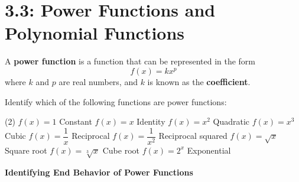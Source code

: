 \documentclass[../mathNotesPreamble]{subfiles}
\providecommand{\relscalefact}{1.4}
\begin{document}
\relscale{\relscalefact}
  \section{3.3: Power Functions and Polynomial Functions}
  \begin{defn*}
    A \textbf{power function} is a function that can be represented in the form
      \[f(x)=kx^p\]
    where $k$ and $p$ are real numbers, and $k$ is known as the \textbf{coefficient}.
  \end{defn*}
  \begin{ex*}
    \TabPositions{35mm}
    Identify which of the following functions are power functions:
    \begin{extasks}[after-item-skip=\stretch{1}](2)
      \task $f(x)=1$ \tab Constant
      \task $f(x)=x$ \tab Identity
      \task $f(x)=x^2$ \tab Quadratic
      \task $f(x)=x^3$ \tab Cubic
      \task $f(x)=\dfrac{1}{x}$ \tab Reciprocal
      \task $f(x)=\dfrac{1}{x^2}$ \tab Reciprocal squared
      \task $f(x)=\sqrt{x}$ \tab Square root
      \task $f(x)=\sqrt[3]{x}$ \tab Cube root
      \task $f(x)=2^x$ \tab Exponential
    \end{extasks}
  \end{ex*}
  \pagebreak

  \noindent
  \textbf{Identifying End Behavior of Power Functions}
\end{document}
